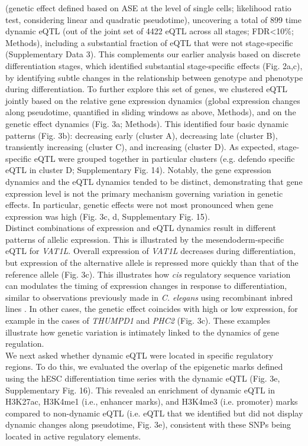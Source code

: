 (genetic effect defined based on ASE at the level of single cells; likelihood ratio test, considering linear and quadratic pseudotime), uncovering a total of 899 time dynamic eQTL (out of the joint set of 4422 eQTL across all stages; FDR<10\%; Methods), including a substantial fraction of eQTL that were not stage-specific (Supplementary Data 3). 
This complements our earlier analysis based on discrete differentiation stages, which identified substantial stage-specific effects (Fig. 2a,c), by identifying subtle changes in the relationship between genotype and phenotype during differentiation. 
To further explore this set of genes, we clustered eQTL jointly based on the relative gene expression dynamics (global expression changes along pseudotime, quantified in sliding windows as above, Methods), and on the genetic effect dynamics (Fig. 3a; Methods). 
This identified four basic dynamic patterns (Fig. 3b): decreasing early (cluster A), decreasing late (cluster B), transiently increasing (cluster C), and increasing (cluster D). 
As expected, stage-specific eQTL were grouped together in particular clusters (e.g. defendo specific eQTL in cluster D; Supplementary Fig. 14). 
Notably, the gene expression dynamics and the eQTL dynamics tended to be distinct, demonstrating that gene expression level is not the primary mechanism governing variation in genetic effects. 
In particular, genetic effects were not most pronounced when gene expression was high (Fig. 3c, d, Supplementary Fig. 15).\\

Distinct combinations of expression and eQTL dynamics result in different patterns of allelic expression. 
This is illustrated by the mesendoderm-specific eQTL for \textit{VAT1L}. 
Overall expression of \textit{VAT1L} decreases during differentiation, but expression of the alternative allele is repressed more quickly than that of the reference allele (Fig. 3c). 
This illustrates how \textit{cis} regulatory sequence variation can modulates the timing of expression changes in response to differentiation, similar to observations previously made in \textit{C. elegans} using recombinant inbred lines \cite{francesconi2014effects}. 
In other cases, the genetic effect coincides with high or low expression, for example in the cases of \textit{THUMPD1} and \textit{PHC2} (Fig. 3c). 
These examples illustrate how genetic variation is intimately linked to the dynamics of gene regulation.\\

We next asked whether dynamic eQTL were located in specific regulatory regions. 
To do this, we evaluated the overlap of the epigenetic marks defined using the hESC differentiation time series with the dynamic eQTL (Fig. 3e, Supplementary Fig. 16). 
This revealed an enrichment of dynamic eQTL in H3K27ac, H3K4me1 (i.e., enhancer marks), and H3K4me3 (i.e. promoter) marks compared to non-dynamic eQTL (i.e. eQTL that we identified but did not display dynamic changes along pseudotime, Fig. 3e), consistent with these SNPs being located in active regulatory elements.

